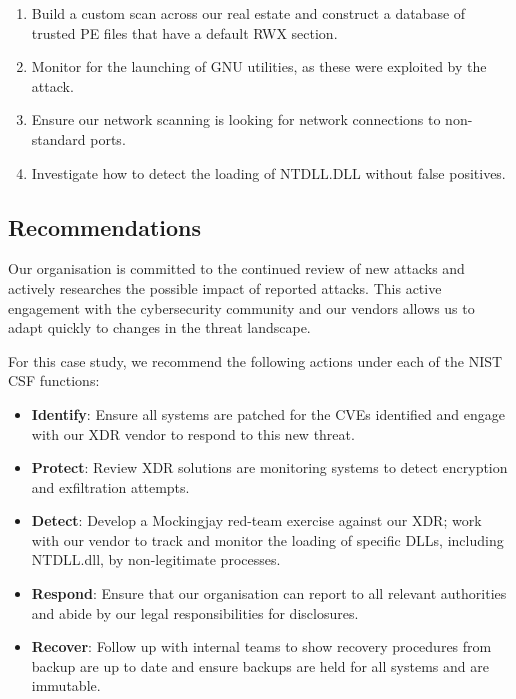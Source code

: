 \begin{enumerate}
\item Build a custom scan across our real estate and construct a database of trusted PE files that have a default RWX section.
\item Monitor for the launching of GNU utilities, as these were exploited by the attack.
\item Ensure our network scanning is looking for network connections to non-standard ports.
\item Investigate how to detect the loading of NTDLL.DLL without false positives.
\end{enumerate}


\subsection{Recommendations}

Our organisation is committed to the continued review of new attacks and actively researches the possible impact of reported attacks.
This active engagement with the cybersecurity community and our vendors allows us to adapt quickly to changes in the threat landscape.

For this case study, we recommend the following actions under each of the NIST CSF functions:

\begin{itemize}
\item \textbf{Identify}: Ensure all systems are patched for the CVEs identified and engage with our XDR vendor to respond to this new threat.
\item \textbf{Protect}: Review XDR solutions are monitoring systems to detect encryption and exfiltration attempts.
\item \textbf{Detect}: Develop a Mockingjay red-team exercise against our XDR; work with our vendor to track and monitor the loading of specific
  DLLs, including NTDLL.dll, by non-legitimate processes.
\item \textbf{Respond}: Ensure that our organisation can report to all relevant authorities and abide by our legal
  responsibilities for disclosures.
\item \textbf{Recover}: Follow up with internal teams to show recovery procedures from backup are up to date and ensure backups
  are held for all systems and are immutable. 
\end{itemize}
